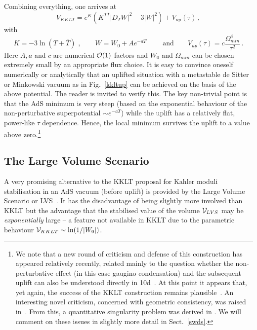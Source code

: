 \documentclass[12pt]{article}
\newcommand{\be}{\begin{equation}}
\newcommand{\ee}{\end{equation}}
\newcommand{\ol}{\overline}
\numberwithin{equation}{section}
\begin{document}
Combining everything, one arrives at
\be
V_{KKLT}=e^{K}\left(K^{T\ol{T}}|D_TW|^2-3|W|^2\right)+V_{up}(\tau)\,,
\ee
with
\be
K=-3\ln(T+\ol{T})\,\,,\qquad W=W_0+Ae^{-aT}\,\,\qquad\mbox{and}\qquad
V_{up}(\tau)=c\frac{\Omega_{min}^4}{\tau^2}\,.
\ee
Here $A,a$ and $c$ are numerical ${\cal O}(1)$ factors and $W_0$ and $\Omega_{min}$ can be chosen extremely small by an appropriate flux choice. It is easy to convince oneself numerically or analytically that an uplifted situation with a metastable de Sitter or Minkowski vacuum as in Fig.~\ref{kkltup} can be achieved on the basis of the above potential. The reader is invited to verify this. The key non-trivial point is that the AdS minimum is very steep (based on the exponential behaviour of the non-perturbative superpotential $\sim e^{-aT}$) while the uplift has a relatively flat, power-like $\tau$ dependence. Hence, the local minimum survives the uplift to a value above zero.\footnote{
We 
note that a new round of criticism and defense of this construction has appeared relatively recently, related mainly to the question whether the non-perturbative effect (in this case gaugino condensation) and the subsequent uplift can also be understood directly in 10d~\cite{Moritz:2017xto, Hamada:2018qef, Kallosh:2019oxv, Hamada:2019ack, Gautason:2019jwq, Carta:2019rhx}. At this point it appears that, yet again, the success of the KKLT construction remains plausible~\cite{Hamada:2019ack}. An interesting novel criticism, concerned with geometric consistency, was raised in~\cite{Carta:2019rhx}. From this, a quantitative singularity problem was derived in \cite{Gao:2020xqh}. We will comment on these issues in slightly more detail in Sect.~\ref{swds}.}






\subsection{The Large Volume Scenario}

A very promising alternative to the KKLT proposal for Kahler moduli stabilisation in an AdS vacuum (before uplift) is provided by the Large Volume 
Scenario or LVS~\cite{Balasubramanian:2005zx, Conlon:2005ki}. It has the disadvantage of being slightly more involved than KKLT but the advantage that the stabilised value of the volume ${\cal V}_{LVS}$ may be {\it exponentially} large -- a feature not available in KKLT due to the parametric behaviour ${\cal V}_{KKLT}\sim \ln(1/|W_0|)$. 
\end{document}
